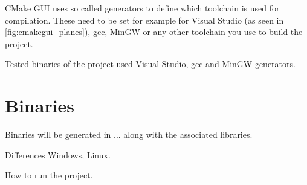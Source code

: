 CMake GUI uses so called generators to define which toolchain is used for compilation. These need to be set for example for Visual Studio (as seen in \ref{fig:cmakegui_planes}), gcc, MinGW or any other toolchain you use to build the project.

Tested binaries of the project used Visual Studio, gcc and MinGW generators.

\section {Binaries}

Binaries will be generated in ... along with the associated libraries. 

Differences Windows, Linux.

How to run the project.